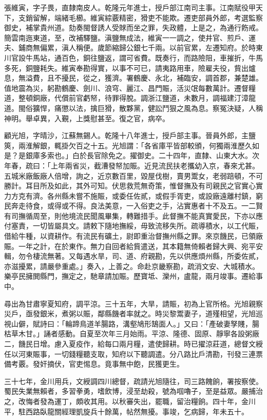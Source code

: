 \begin{pinyinscope}
張維寅，字子畏，直隸南皮人。乾隆元年進士，授戶部江南司主事。江南賦役甲天下，支銷留解，端緒毛櫛。維寅綜覈精密，猾吏不能欺。遷吏部員外郎，考選監察御史，補掌貴州道。劾奏閩督誘人受賕而坐之罪，失政體，上是之，為通行飭戒。簡雲南迤東道，至，改補驛鹽。滇鹽無成法，維寅一一調之，使井官、煎戶、運夫、鋪商無偏累，滇人稱便。歲節縮歸公銀七千兩。以前官累，左遷知府。於時東川官設牛馬站，通百色，銅往鹽返，謂可省費。既奏行，而路險阻，車摧折，牛馬多死，銅鹽耗失。維寅奉勘得實，以事不可已，請夷路用車，險雇夫役，貲出爐息，無溢費，且不擾民，從之，獲濟。署鶴慶、永北，補臨安，調首郡，兼楚雄。值地震為災，躬勘鶴慶、劍川、浪穹、麗江、昌門賑，活災氓每數萬計。遷督糧道，整頓銅廠，代償前官虧帑，待罪得脫。調浙江鹽道，未數月，調福建汀漳龍道。閩俗獷悍，痛懲以法，擒巨猾，散夥黨，健訟鬥狠之風為息。察冤決疑，人稱神明。舉卓異，入覲，上獎慰甚至。復之官，病卒。

顧光旭，字晴沙，江蘇無錫人。乾隆十八年進士，授戶部主事。晉員外郎，主鹽筴，兩淮解銀，輒掛欠百之十五。光旭謂：「各省庫平皆部較頒，何獨兩淮歷久如是？是銀庫多索也。」白於長官除免之。擢御史。二十四年，直隸、山東大水。次年春，疏曰：「上年兩省災，截漕發帑加賑。近見流民扶老攜幼入京，春來尤甚。五城米廠飯廠人倍增，詢之，近京數百里，毀屋伐樹，賣男鬻女，老弱踣頓，不可勝計。耳目所及如此，其外可知。伏思救荒無奇策，惟督撫及有司親民之官實心實力方克有濟。各州縣未嘗不施賑，或委任佐貳，或假手胥吏，或設廠遠離村鎮，窮民奔走待食，或得或不得。良法美意，一入俗吏之手，沾實惠者十不及五。一二賢有司撫循周至，則他境流民聞風畢集，轉難措手。此督撫不能真實愛民，下亦以應付塞責，一切皆屬具文。請敕下隨地撫綏，毋致流移失所。疏導積水，以工代賑，借給牛種，以資耕作。有流民有礦土，尉即重治督撫州縣之罪。來京饑民，已領廠賑。一年之計，在於東作。無力自回者給貲遣送，其本籍無倚賴者歸大興、宛平安輯，勿令棲流無著。又每遇水旱，司、道、府親勘，先以供應煩州縣，所委佐貳，亦滋擾累，請嚴參重處。」奏入，上善之。命赴京畿察勘，疏消文安、大城積水。樂亭民擁閧縣門，撫定之，馳章請加賑。歷寶坻、灤州，盧龍，兩月竣事。遷給事中。

尋出為甘肅寧夏知府，調平涼。三十五年，大旱，請賑，初為上官所格。光旭親察災戶，亟發銀米，煮粥以賑，鄰縣饑者率就之。時災黎鬻妻子，道殣相望，光旭巡視山僻，賦詩曰：「輪蹄鳥道羊腸路，溝壑鳩形鵠面人。」又曰：「產破妻孥賤，腸枯草木甘。」誦者感動。自夏至次年三月始雨。平涼、隆德、固原、靜寧各設粥廠二，饑民日增。慮入夏疫作，給每口兩月糧，遣使歸耕。時已擢涼莊道，總督文綬任以河東賑事，一切錢糧聽支取，知府以下聽調遣。分八路比戶清勘，刊發三連票備考覈。發奸摘伏，官吏惕息。竟事無中飽，民獲更生。

三十七年，金川用兵，文綬調四川總督，疏請光旭隨往，司三路餽餉，署按察使。蜀民失業無賴者，多習拳勇，嗜飲博，浸至劫殺，號為啯嚕子，至是益眾。嚴捕治之，改悔者發為運丁，頗收其用。以秋審失出，罷職，留治糧餉。四十年，金川平，駐西路臥龍關經理凱旋兵十餘萬，帖然無擾。事竣，乞病歸，年未五十。


\end{pinyinscope}
